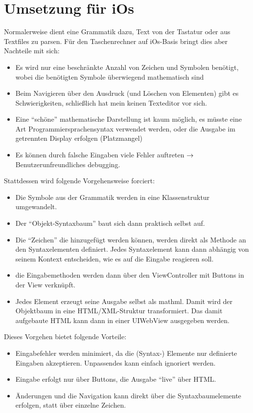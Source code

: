 \section{Umsetzung für iOs}
Normalerweise dient eine Grammatik dazu, Text von der Tastatur oder aus Textfiles zu parsen. Für den Taschenrechner auf iOs-Basis bringt dies aber Nachteile mit sich:
\begin{itemize}
	\item Es wird nur eine beschränkte Anzahl von Zeichen und Symbolen benötigt, 
		wobei die benötigten Symbole überwiegend mathematisch sind
	\item Beim Navigieren über den Ausdruck (und Löschen von Elementen) gibt es Schwierigkeiten, 
		schließlich hat mein keinen Texteditor vor sich.
	\item Eine ``schöne'' mathematische Darstellung ist kaum möglich, es müsste eine Art Programmiersprachensyntax verwendet werden, oder die Ausgabe im getrennten Display erfolgen (Platzmangel)
	\item Es können durch falsche Eingaben viele Fehler auftreten $\rightarrow$ Benutzerunfreundliches debugging.
\end{itemize}
Stattdessen wird folgende Vorgehensweise forciert:
\begin{itemize}
	\item Die Symbole aus der Grammatik werden in eine Klassenstruktur umgewandelt.
	\item Der ``Objekt-Syntaxbaum'' baut sich dann praktisch selbst auf.
	\item Die ``Zeichen'' die hinzugefügt werden können, werden direkt als Methode an den Syntaxelementen definiert. Jedes Syntaxelement kann dann abhängig von seinem Kontext entscheiden, wie es auf die Eingabe reagieren soll.
	\item die Eingabemethoden werden dann über den ViewController mit Buttons in der View verknüpft.
	\item Jedes Element erzeugt seine Ausgabe selbst als mathml. Damit wird der Objektbaum in eine HTML/XML-Struktur transformiert.  Das damit aufgebaute HTML kann dann in einer UIWebView ausgegeben werden.
\end{itemize}
Dieses Vorgehen bietet folgende Vorteile:
\begin{itemize}
	\item Eingabefehler werden minimiert, da die (Syntax-) Elemente nur definierte Eingaben akzeptieren. Unpassendes kann einfach ignoriert werden.
	\item Eingabe erfolgt nur über Buttons, die Ausgabe ``live'' über HTML.
	\item Änderungen und die Navigation kann direkt über die Syntaxbaumelemente erfolgen, statt über einzelne Zeichen.
\end{itemize}

